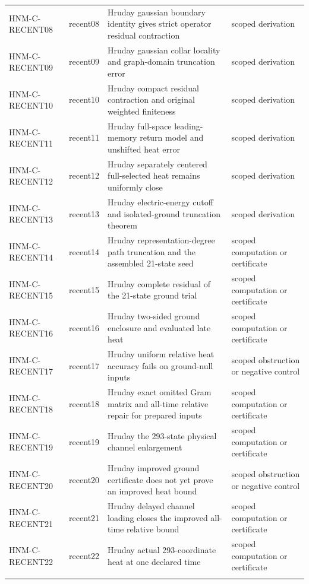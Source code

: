 \begin{longtable}{@{}p{30mm}p{26mm}p{65mm}p{27mm}@{}}
HNM-C-RECENT08 & recent08 & Hruday gaussian boundary identity gives strict operator residual contraction & scoped derivation\\\addlinespace
HNM-C-RECENT09 & recent09 & Hruday gaussian collar locality and graph-domain truncation error & scoped derivation\\\addlinespace
HNM-C-RECENT10 & recent10 & Hruday compact residual contraction and original weighted finiteness & scoped derivation\\\addlinespace
HNM-C-RECENT11 & recent11 & Hruday full-space leading-memory return model and unshifted heat error & scoped derivation\\\addlinespace
HNM-C-RECENT12 & recent12 & Hruday separately centered full-selected heat remains uniformly close & scoped derivation\\\addlinespace
HNM-C-RECENT13 & recent13 & Hruday electric-energy cutoff and isolated-ground truncation theorem & scoped derivation\\\addlinespace
HNM-C-RECENT14 & recent14 & Hruday representation-degree path truncation and the assembled 21-state seed & scoped computation or certificate\\\addlinespace
HNM-C-RECENT15 & recent15 & Hruday complete residual of the 21-state ground trial & scoped computation or certificate\\\addlinespace
HNM-C-RECENT16 & recent16 & Hruday two-sided ground enclosure and evaluated late heat & scoped computation or certificate\\\addlinespace
HNM-C-RECENT17 & recent17 & Hruday uniform relative heat accuracy fails on ground-null inputs & scoped obstruction or negative control\\\addlinespace
HNM-C-RECENT18 & recent18 & Hruday exact omitted Gram matrix and all-time relative repair for prepared inputs & scoped computation or certificate\\\addlinespace
HNM-C-RECENT19 & recent19 & Hruday the 293-state physical channel enlargement & scoped computation or certificate\\\addlinespace
HNM-C-RECENT20 & recent20 & Hruday improved ground certificate does not yet prove an improved heat bound & scoped obstruction or negative control\\\addlinespace
HNM-C-RECENT21 & recent21 & Hruday delayed channel loading closes the improved all-time relative bound & scoped computation or certificate\\\addlinespace
HNM-C-RECENT22 & recent22 & Hruday actual 293-coordinate heat at one declared time & scoped computation or certificate\\\addlinespace

\end{longtable}
